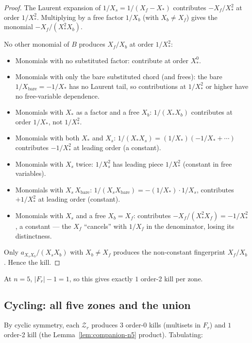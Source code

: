 \documentclass[11pt]{article}
\newcommand{\Z}{\mathcal{Z}}
\theoremstyle{definition}
\begin{document}
\begin{proof}
The Laurent expansion of $1/X_s = 1/(X_f - X_*)$ contributes
$-X_f/X_*^2$ at order $1/X_*^2$. Multiplying by a free factor $1/X_b$
(with $X_b\ne X_f$) gives the monomial $-X_f/(X_*^2 X_b)$.

No other monomial of $B$ produces $X_f/X_b$ at order $1/X_*^2$:
\begin{itemize}[nosep,leftmargin=2em]
\item Monomials with no substituted factor: contribute at order $X_*^0$.
\item Monomials with only the bare substituted chord (and frees): the bare
$1/X_{\text{bare}} = -1/X_*$ has no Laurent tail, so contributions at
$1/X_*^2$ or higher have no free-variable dependence.
\item Monomials with $X_*$ as a factor and a free $X_b$: $1/(X_* X_b)$
contributes at order $1/X_*$, not $1/X_*^2$.
\item Monomials with both $X_*$ and $X_s$: $1/(X_* X_s) = (1/X_*)(-1/X_* + \cdots)$
contributes $-1/X_*^2$ at leading order (a constant).
\item Monomials with $X_s$ twice: $1/X_s^2$ has leading piece $1/X_*^2$
(constant in free variables).
\item Monomials with $X_s\,X_{\text{bare}}$: $1/(X_s X_{\text{bare}}) =
-(1/X_*)\cdot 1/X_s$, contributes $+1/X_*^2$ at leading order (constant).
\item Monomials with $X_s$ and a free $X_b = X_f$: contributes
$-X_f/(X_*^2 X_f) = -1/X_*^2$, a constant — the $X_f$ ``cancels''
with $1/X_f$ in the denominator, losing its distinctness.
\end{itemize}
Only $a_{X_s X_b}/(X_s X_b)$ with $X_b\ne X_f$ produces the non-constant
fingerprint $X_f/X_b$. Hence the kill.
\end{proof}

At $n=5$, $|F_r|-1=1$, so this gives exactly $1$ order-2 kill per zone.

\subsection{Cycling: all five zones and the union}

By cyclic symmetry, each $\Z_r$ produces $3$ order-0 kills (multisets in
$F_r$) and $1$ order-2 kill (the Lemma~\ref{lem:companion-n5} product).
Tabulating:
\end{document}
